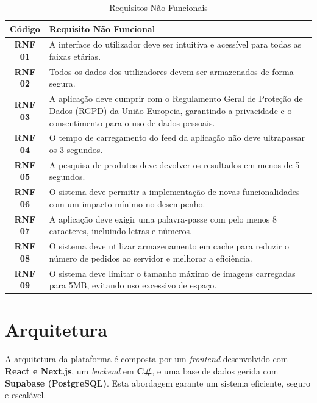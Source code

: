 \documentclass[a4paper, 12pt]{article} %
\begin{document}
\begin{table}[H]
	\centering
	\renewcommand{\arraystretch}{1.3}
	\begin{tabular}{|c|p{12cm}|}
		\hline
		\textbf{Código} & \textbf{Requisito Não Funcional} \\
		\hline
		\textbf{RNF 01} & A interface do utilizador deve ser intuitiva e acessível para todas as faixas etárias. \\
		\hline
		\textbf{RNF 02} & Todos os dados dos utilizadores devem ser armazenados de forma segura. \\
		\hline
		\textbf{RNF 03} & A aplicação deve cumprir com o Regulamento Geral de Proteção de Dados (RGPD) da União Europeia, garantindo a privacidade e o consentimento para o uso de dados pessoais. \\
		\hline
		\textbf{RNF 04} & O tempo de carregamento do feed da aplicação não deve ultrapassar os 3 segundos. \\
		\hline
		\textbf{RNF 05} & A pesquisa de produtos deve devolver os resultados em menos de 5 segundos.\\
		\hline
		\textbf{RNF 06} & O sistema deve permitir a implementação de novas funcionalidades com um impacto mínimo no desempenho. \\
		\hline
		\textbf{RNF 07} & A aplicação deve exigir uma palavra-passe com pelo menos 8 caracteres, incluindo letras e números. \\
		\hline
		\textbf{RNF 08} & O sistema deve utilizar armazenamento em cache para reduzir o número de pedidos ao servidor e melhorar a eficiência. \\
		\hline
		\textbf{RNF 09} & O sistema deve limitar o tamanho máximo de imagens carregadas para 5MB, evitando uso excessivo de espaço. \\
		\hline
	\end{tabular}
	\caption{Requisitos Não Funcionais}
	\label{tab:requisitos_nao_funcionais}
\end{table}


\newpage

\section{Arquitetura}
A arquitetura da plataforma é composta por um \textit{frontend} desenvolvido com \textbf{React e Next.js}, um \textit{backend} em \textbf{C\#}, e uma base de dados gerida com \textbf{Supabase (PostgreSQL)}. Esta abordagem garante um sistema eficiente, seguro e escalável.
\end{document}
